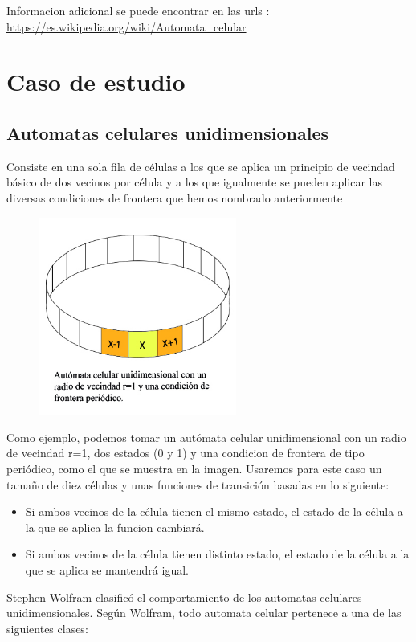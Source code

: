 \documentclass[a4paper,12pt]{article}
\begin{document}
  
   Informacion adicional se puede encontrar en las urls :
   \url{https://es.wikipedia.org/wiki/Automata_celular}

\section{Caso de estudio}
   \subsection{Automatas celulares unidimensionales}

Consiste en una sola fila de células a los que se aplica un principio de vecindad básico de dos vecinos por célula y a los que igualmente se pueden aplicar las diversas condiciones de frontera que hemos nombrado anteriormente

\begin{figure}[htp]
\centering
\includegraphics[width=6.5cm]{01.jpg}
\label{fig:lion}
\end{figure}

Como ejemplo, podemos tomar un autómata celular unidimensional con un radio de vecindad r=1, dos estados (0 y 1) y una condicion de frontera de tipo periódico, como el que se muestra en la imagen. Usaremos para este caso un tamaño de diez células y unas funciones de transición basadas en lo siguiente: 
\begin{itemize}
  \item Si ambos vecinos de la célula tienen el mismo estado, el estado de la célula a la que se aplica la funcion cambiará.
  \item Si ambos vecinos de la célula tienen distinto estado, el estado de la célula a la que se aplica se mantendrá igual.
\end{itemize}

\clearpage

Stephen Wolfram clasificó el comportamiento de los automatas celulares unidimensionales. Según Wolfram, todo automata celular pertenece a una de las siguientes clases:
\end{document}
